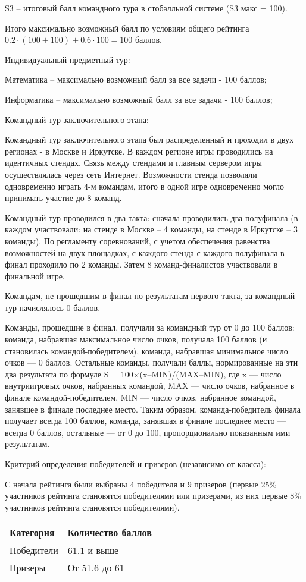 S3 – итоговый балл командного тура в стобалльной системе (S3 макс = 100).

Итого максимально возможный балл по условиям общего рейтинга $0.2 \cdot (100+100) + 0.6 \cdot 100 = 100$ баллов.

Индивидуальный предметный тур:

Математика – максимально возможный балл за все задачи - 100 баллов;

Информатика – максимально возможный балл за все задачи - 100 баллов;

Командный тур заключительного этапа:

Командный тур заключительного этапа был распределенный и проходил в двух регионах - в Москве и Иркутске. В каждом регионе игры проводились на идентичных стендах. Связь между стендами и главным сервером игры осуществлялась через сеть Интернет. Возможности стенда позволяли одновременно играть 4-м командам, итого в одной игре одновременно могло принимать участие до 8 команд.

Командный тур проводился в два такта: сначала проводились два полуфинала (в каждом участвовали: на стенде в Москве – 4 команды, на стенде в Иркутске – 3 команды). По регламенту соревнований, с учетом обеспечения равенства возможностей на двух площадках, с каждого стенда с каждого полуфинала в финал проходило по 2 команды. Затем 8 команд-финалистов участвовали в финальной игре.

Командам, не прошедшим в финал по результатам первого такта, за командный тур начислялось 0 баллов.

Команды, прошедшие в финал, получали за командный тур от 0 до 100 баллов: команда, набравшая максимальное число очков, получала 100 баллов (и становилась командой-победителем), команда, набравшая минимальное число очков — 0 баллов. Остальные команды, получали баллы, нормированные на эти два результата по формуле S = 100×(x–MIN)/(MAX–MIN), где x — число внутриигровых очков, набранных командой, MAX — число очков, набранное в финале командой-победителем, MIN — число очков, набранное командой, занявшее в финале последнее место. Таким образом, команда-победитель финала получает всегда 100 баллов, команда, занявшая в финале последнее место — всегда 0 баллов, остальные — от 0 до 100, пропорционально показанным ими результатам.

Критерий определения победителей и призеров (независимо от класса):

С начала рейтинга были выбраны 4 победителя и 9 призеров (первые 25\% участников рейтинга становятся победителями или призерами, из них первые 8\% участников рейтинга становятся победителями).

\begin{center}
    \begin{tabular}{|l|l|}
        \hline
        Категория&Количество баллов\\
        \hline
        Победители&61.1 и выше\\
        \hline
        Призеры&От 51.6 до 61\\
        \hline
    \end{tabular}
\end{center}